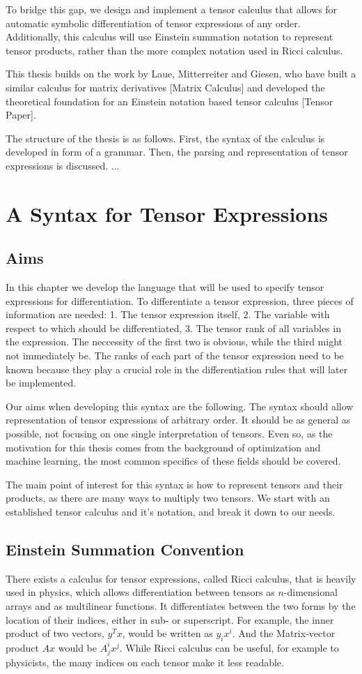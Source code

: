 \documentclass[12pt, a4paper]{report}
\begin{document}
To bridge this gap, we design and implement a tensor calculus that allows for automatic symbolic differentiation of tensor expressions of any order.
Additionally, this calculus will use Einstein summation notation to represent tensor products, rather than the more complex notation used in Ricci calculus.

This thesis builds on the work by Laue, Mitterreiter and Giesen, who have built a similar calculus for matrix derivatives [Matrix Calculus] and developed the theoretical foundation for an Einstein notation based tensor calculus [Tensor Paper].

The structure of the thesis is as follows.
First, the syntax of the calculus is developed in form of a grammar.
Then, the parsing and representation of tensor expressions is discussed.
...

\chapter{A Syntax for Tensor Expressions}
\section{Aims}
In this chapter we develop the language that will be used to specify tensor expressions for differentiation.
To differentiate a tensor expression, three pieces of information are needed: 1. The tensor expression itself, 2. The variable with respect to which should be differentiated, 3. The tensor rank of all variables in the expression.
The neccessity of the first two is obvious, while the third might not immediately be.
The ranks of each part of the tensor expression need to be known because they play a crucial role in the differentiation rules that will later be implemented.

Our aims when developing this syntax are the following.
The syntax should allow representation of tensor expressions of arbitrary order.
It should be as general as possible, not focusing on one single interpretation of tensors.
Even so, as the motivation for this thesis comes from the background of optimization and machine learning, the most common specifics of these fields should be covered.

The main point of interest for this syntax is how to represent tensors and their products, as there are many ways to multiply two tensors.
We start with an established tensor calculus and it's notation, and break it down to our needs.

\section{Einstein Summation Convention}
There exists a calculus for tensor expressions, called Ricci calculus, that is heavily used in physics, which allows differentiation between tensors as $n$-dimensional arrays and as multilinear functions.
It differentiates between the two forms by the location of their indices, either in sub- or superscript.
For example, the inner product of two vectors, $y^Tx$, would be written as $y_ix^i$. And the Matrix-vector product $Ax$ would be $A^i_jx^j$.
While Ricci calculus can be useful, for example to physicists, the many indices on each tensor make it less readable.
\end{document}
